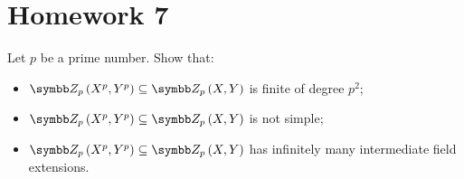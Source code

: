 \section*{Homework 7}

\setcounter{exercise}{0}

\begin{exercise}
Let \(p\) be a prime number. Show that:
\begin{itemize}
    \item \(\adjoin[\integersmod{p}]{X^p, Y^p} \subseteq \adjoin[\integersmod{p}]{X, Y}\) is finite of degree \(p^2\);
    
    \item \(\adjoin[\integersmod{p}]{X^p, Y^p} \subseteq \adjoin[\integersmod{p}]{X, Y}\) is not simple;

    \item \(\adjoin[\integersmod{p}]{X^p, Y^p} \subseteq \adjoin[\integersmod{p}]{X, Y}\) has infinitely many intermediate field extensions.
\end{itemize}
\end{exercise}
